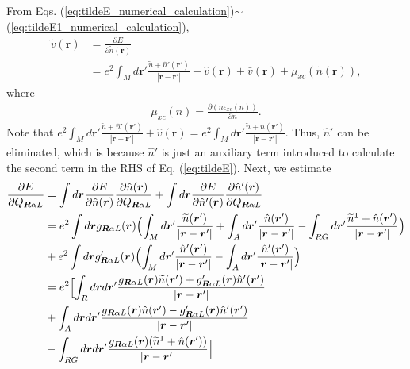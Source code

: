 \documentclass{article}
\begin{document}
From Eqs. (\ref{eq:tildeE_numerical_calculation})$\sim$(\ref{eq:tildeE1_numerical_calculation}),
\begin{align}
  \widetilde{v}(\bm{r}) &= 
  \frac{\partial E}{\partial \widetilde{n}(\bm{r})}
  \nonumber
  \\&=
  e^2 \int_M d\bm{r}' \frac{\widetilde{n} + \hat{n}'(\bm{r}')}{|\bm{r}-\bm{r}'|}
  + \hat{v}(\bm{r}) + \bar{v}(\bm{r})
  + \mu_{xc}(\widetilde{n}(\bm{r})),
\end{align}
where
\begin{align}
  \mu_{xc}(n) = \frac{\partial (n\epsilon_{xc}(n))}{\partial n}.
\end{align}
Note that 
$e^2 \int_M d\bm{r}' \frac{\widetilde{n} + \hat{n}'(\bm{r}')}{|\bm{r}-\bm{r}'|}
+ \hat{v}(\bm{r})
= 
e^2 \int_M d\bm{r}' \frac{\widetilde{n} + \hat{n}(\bm{r}')}{|\bm{r}-\bm{r}'|}
$. Thus, $\hat{n}'$ can be eliminated, which is because $\hat{n}'$ is just an auxiliary term introduced to calculate the second term in the RHS of Eq. (\ref{eq:tildeE}).
Next, we estimate
\begin{align}
  \frac{\partial E}{\partial Q_{\bm{R}\alpha L}} 
  &=
  \int d\bm{r}\frac{\partial E}{\partial \hat{n}(\bm{r})} \frac{\partial \hat{n}(\bm{r})}{\partial Q_{\bm{R}\alpha L}} 
  +
  \int d\bm{r}\frac{\partial E}{\partial \hat{n}'(\bm{r})} \frac{\partial \hat{n}'(\bm{r})}{\partial Q_{\bm{R}\alpha L}} 
  \nonumber
  \\&=
  e^2\int d\bm{r} g_{\bm{R}\alpha L}(\bm{r})
  \Bigl(
    \int_M d\bm{r}' \frac{\widetilde{n}(\bm{r}')}{|\bm{r} - \bm{r}'|}
    + 
    \int_A d\bm{r}' \frac{\hat{n}(\bm{r}')}{|\bm{r} - \bm{r}'|}
    -
    \int_{RG} d\bm{r}' \frac{\widetilde{n}^1 + \hat{n}(\bm{r}')}{|\bm{r} - \bm{r}'|}
  \Bigr)
  \label{eq:dE_dQRaL_g}
  \\&+
  e^2\int d\bm{r} g'_{\bm{R}\alpha L}(\bm{r})
  \Bigl(
    \int_M d\bm{r}' \frac{\hat{n}'(\bm{r}')}{|\bm{r} - \bm{r}'|}
    -
    \int_A d\bm{r}' \frac{\hat{n}'(\bm{r}')}{|\bm{r} - \bm{r}'|}
  \Bigr)
  \label{eq:dE_dQRaL_gp}
  \\&=
  e^2
  \Bigl[
    \int_R d\bm{r} d\bm{r}' \frac{g_{\bm{R}\alpha L}(\bm{r})\widetilde{n}(\bm{r}') + g'_{\bm{R}\alpha L}(\bm{r})\hat{n}'(\bm{r}')}{|\bm{r} - \bm{r}'|}
    \nonumber
    \\&
    + \int_A d\bm{r} d\bm{r}' \frac{g_{\bm{R}\alpha L}(\bm{r})\hat{n}(\bm{r}') - g'_{\bm{R}\alpha L}(\bm{r})\hat{n}'(\bm{r}')}{|\bm{r} - \bm{r}'|}
    \nonumber
    \\&
    - \int_{RG} d\bm{r} d\bm{r}' \frac{g_{\bm{R}\alpha L}(\bm{r})(\widetilde{n}^1 + \hat{n}(\bm{r}'))}{|\bm{r} - \bm{r}'|}
  \Bigr]
  \label{eq:dE_dQRaL}
\end{align}
\end{document}
